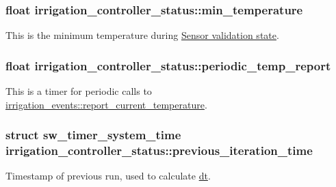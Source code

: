 \subsubsection[{min\+\_\+temperature}]{\setlength{\rightskip}{0pt plus 5cm}float irrigation\+\_\+controller\+\_\+status\+::min\+\_\+temperature}\label{structirrigation__controller__status_a451e58983d5995bf6f1e00f9318d5dd6}


This is the minimum temperature during \hyperlink{group__state__validate}{Sensor validation state}. 

\hypertarget{structirrigation__controller__status_aab428bb9e677098d336aefd32b5e6232}{}
\subsubsection[{periodic\+\_\+temp\+\_\+report}]{\setlength{\rightskip}{0pt plus 5cm}float irrigation\+\_\+controller\+\_\+status\+::periodic\+\_\+temp\+\_\+report}\label{structirrigation__controller__status_aab428bb9e677098d336aefd32b5e6232}


This is a timer for periodic calls to \hyperlink{structirrigation__events_a47b81edd52377b4c4e1ed512b830e237}{irrigation\+\_\+events\+::report\+\_\+current\+\_\+temperature}. 

\hypertarget{structirrigation__controller__status_ab5a5ed310a96d8fd4db605bad57bf83a}{}
\subsubsection[{previous\+\_\+iteration\+\_\+time}]{\setlength{\rightskip}{0pt plus 5cm}struct {\bf sw\+\_\+timer\+\_\+system\+\_\+time} irrigation\+\_\+controller\+\_\+status\+::previous\+\_\+iteration\+\_\+time}\label{structirrigation__controller__status_ab5a5ed310a96d8fd4db605bad57bf83a}


Timestamp of previous run, used to calculate \hyperlink{structirrigation__controller__status_a0a4447a8aa2200bacf97bd7e844493c1}{dt}. 

